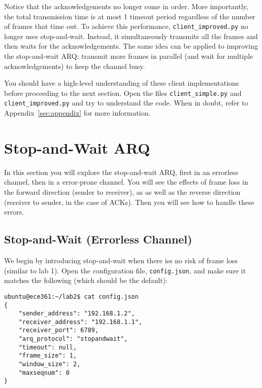 \documentclass[11pt]{article}
\begin{document}
Notice that the acknowledgements no longer come in order.
More importantly, the total transmission time is at most 1 timeout period regardless of the number of frames that time out.
To achieve this performance, \texttt{client\_improved.py} no longer uses stop-and-wait.
Instead, it simultaneously transmits all the frames and then waits for the acknowledgements.
The same idea can be applied to improving the stop-and-wait ARQ: transmit more frames in parallel (and wait for multiple acknowledgements) to keep the channel busy.

You should have a high-level understanding of these client implementations before proceeding to the next section.
Open the files \texttt{client\_simple.py} and \texttt{client\_improved.py} and try to understand the code.
When in doubt, refer to Appendix~\ref{sec:appendix} for more information.

\section{Stop-and-Wait ARQ}
\label{sec:example}
In this section you will explore the stop-and-wait ARQ, first in an errorless channel, then in a error-prone channel.
You will see the effects of frame loss in the forward direction (sender to receiver), as as well as the reverse direction (receiver to sender, in the case of ACKs).
Then you will see how to handle these errors.

\subsection{Stop-and-Wait (Errorless Channel)}
We begin by introducing stop-and-wait when there iss no risk of frame loss (similar to lab 1).
Open the configuration file, \texttt{config.json}, and make sure it matches the following (which should be the default):
\begin{lstlisting}[style=ece361-shell-base, caption={Configuration For Small File}]
ubuntu@ece361:~/lab2$ cat config.json
{
    "sender_address": "192.168.1.2",
    "receiver_address": "192.168.1.1",
    "receiver_port": 6789,
    "arq_protocol": "stopandwait",
    "timeout": null,
    "frame_size": 1,
    "window_size": 2,
    "maxseqnum": 0
}
\end{lstlisting}
\end{document}
